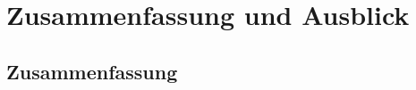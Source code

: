 \documentclass[11pt,        %
  english,ngerman,          %
  paper=a4,                 %
  captions=tablesignature,  %
  listof=numbered,          %
  bibliography=totoc,       %
  headings=small,           %
  headinclude=false,        %
  footinclude=false,        %
  parskip=half-,            %
  oneside,                  %
  BCOR=15mm,                 %
  DIV=12                    %
  ]{scrbook}                %
\begin{document}

\chapter{Zusammenfassung und Ausblick}\label{chapter:conclusions}


\section{Zusammenfassung}\label{sec:conc_summary}
\end{document}
